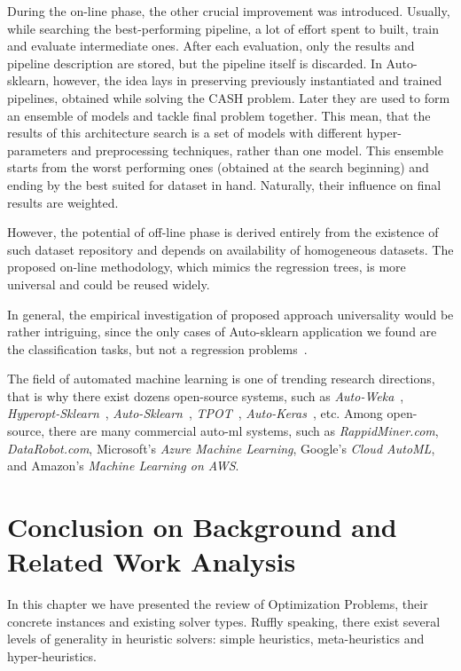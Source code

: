 During the on-line phase, the other crucial improvement was introduced. 
Usually, while searching the best-performing pipeline, a lot of effort spent to built, train and evaluate intermediate ones. After each evaluation, only the results and pipeline description are stored, but the pipeline itself is discarded. In Auto-sklearn, however, the idea lays in preserving previously instantiated and trained pipelines, obtained while solving the CASH problem. Later they are used to form an ensemble of models and tackle final problem together. This mean, that the results of this architecture search is a set of models with different hyper-parameters and preprocessing techniques, rather than one model. This ensemble starts from the worst performing ones (obtained at the search beginning) and ending by the best suited for dataset in hand. Naturally, their influence on final results are weighted.

However, the potential of off-line phase is derived entirely from the existence of such dataset repository and depends on availability of homogeneous datasets. The proposed on-line methodology, which mimics the regression trees, is more universal and could be reused widely.

In general, the empirical investigation of proposed approach universality would be rather intriguing, since the only cases of Auto-sklearn application we found are the classification tasks, but not a regression problems~\cite{feurer2015efficient,biedenkapp-ecai20}.


The field of automated machine learning is one of trending research directions, that is why there exist dozens open-source systems, such as \textit{Auto-Weka}~\cite{thornton2013auto}, \textit{Hyperopt-Sklearn}~\cite{komer2014hyperopt}, \textit{Auto-Sklearn}~\cite{feurer2015efficient}, \textit{TPOT}~\cite{olson2019tpot}, \textit{Auto-Keras}~\cite{jin2019auto}, etc. Among open-source, there are many commercial auto-ml systems, such as \textit{RappidMiner.com}, \textit{DataRobot.com}, Microsoft’s \textit{Azure Machine Learning}, Google’s \textit{Cloud AutoML}, and Amazon's \textit{Machine Learning on AWS}.


\section{Conclusion on Background and Related Work Analysis}\label{bg: conclusion}
In this chapter we have presented the review of Optimization Problems, their concrete instances and existing solver types.
Ruffly speaking, there exist several levels of generality in heuristic solvers: simple heuristics, meta-heuristics and hyper-heuristics.

